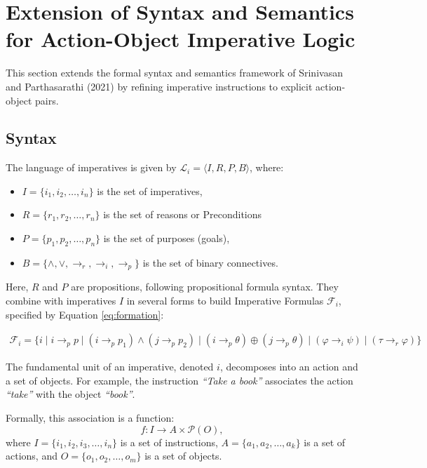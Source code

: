 \documentclass[a4paper,11pt]{lmcs}
\begin{document}
\section{Extension of Syntax and Semantics for Action-Object Imperative Logic}
This section extends the formal syntax and semantics framework of Srinivasan and Parthasarathi (2021) \cite{mira} by refining imperative instructions to explicit action-object pairs.
\subsection{Syntax}
\label{sec:syntax}
The language of imperatives is given by \(\mathcal{L}_i = \langle I, R, P, B \rangle\), where:
\begin{itemize}
  \item \(I = \{ i_1, i_2, \ldots, i_n \}\) is the set of imperatives,
  \item \(R = \{ r_1, r_2, \ldots, r_n \}\) is the set of reasons or Preconditions
  \item \(P = \{ p_1, p_2, \ldots, p_n \}\) is the set of purposes (goals),
  \item \(B = \{ \wedge, \vee, \rightarrow_r, \rightarrow_i, \rightarrow_p \}\) is the set of binary connectives.
\end{itemize}

Here, \(R\) and \(P\) are propositions, following propositional formula syntax. They combine with imperatives \(I\) in several forms to build Imperative Formulas \(\mathcal{F}_i\), specified by Equation \ref{eq:formation}:

\begin{eqnarray}
\label{eq:formation}
\mathcal{F}_i = \{
i \mid i \rightarrow_p p \mid (i \rightarrow_p p_1) \wedge (j \rightarrow_p p_2) \mid (i \rightarrow_p \theta) \oplus (j \rightarrow_p \theta) \mid (\varphi \rightarrow_i \psi) \mid (\tau \rightarrow_r \varphi)
\}
\end{eqnarray}

The fundamental unit of an imperative, denoted \(i\), decomposes into an action and a set of objects. For example, the instruction \emph{``Take a book''} associates the action \emph{``take''} with the object \emph{``book''}.

Formally, this association is a function:
\[
f : I \to A \times \mathcal{P}(O),
\]
where \(I = \{ i_1, i_2, i_3, \ldots, i_n \}\) is a set of instructions,
\(A = \{ a_1, a_2, \ldots, a_k \}\) is a set of actions, and
\(O = \{ o_1, o_2, \ldots, o_m \}\) is a set of objects.
\end{document}
